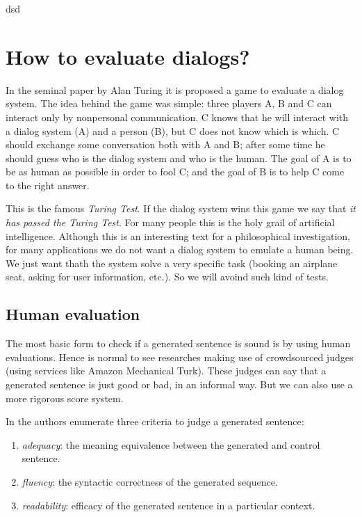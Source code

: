 dsd

\section{How to evaluate dialogs?}

\label{ch:03-eval}

In the seminal paper by Alan Turing \cite{Turing} it is proposed a game to evaluate a dialog system. The idea behind the game was simple: three players A, B and C can interact only by nonpersonal communication. C knows that he will interact with a dialog system (A) and a person (B), but C does not know which is which. C should exchange some conversation both with A and B; after some time he should guess who is the dialog system and who is the human. The goal of A is to be as human as possible in order to fool C; and the goal of B is to help C come to the right answer.

\par This is the famous \textit{Turing Test}. If the dialog system wins this game we say that \textit{it has passed the Turing Test}. For many people this is the holy grail of artificial intelligence. Although this is an interesting text for a philosophical investigation, for many applications we do not want a dialog system to emulate a human being. We just want thath the system solve a very specific task (booking an airplane seat, asking for user information, etc.). So we will avoind such kind of tests.


\subsection{Human evaluation}

The most basic form to check if a generated sentence is sound is by using human evaluations. Hence is normal to see researches making use of crowdsourced judges (using services like Amazon Mechanical Turk). These judges can say that a generated sentence is just good or bad, in an informal way. But we can also use a more rigorous score system. 


In \cite{Stent} the authors enumerate three criteria to judge a generated sentence:

\begin{enumerate}
\item \textit{adequacy}: the meaning equivalence between the generated and control sentence. 
\item \textit{fluency}: the syntactic correctness of the generated sequence.
\item \textit{readability}: efficacy of the generated sentence in a particular context.
\end{enumerate}

